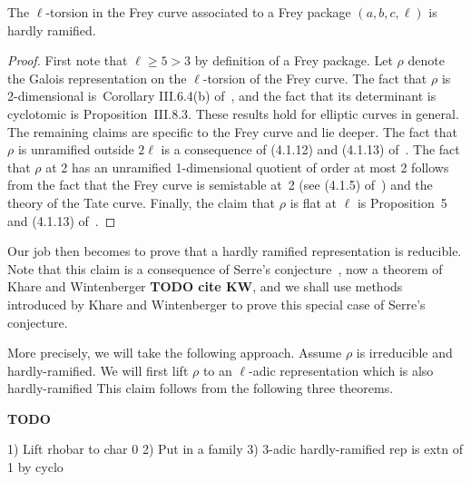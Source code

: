 \begin{theorem}
  \label{Frey_curve_hardly_ramified}
  The $\ell$-torsion in the Frey curve associated to a Frey package $(a,b,c,\ell)$
  is hardly ramified.
\end{theorem}
\begin{proof}
  First note that $\ell\geq5>3$ by definition of a Frey package. Let $\rho$
  denote the Galois representation on the $\ell$-torsion of the Frey curve.
  The fact that $\rho$ is 2-dimensional is~Corollary
  III.6.4(b) of~\cite{silverman1}, and the fact that its determinant is
  cyclotomic is Proposition~III.8.3. These results hold for elliptic curves
  in general. The remaining claims are specific to the Frey curve and lie
  deeper. The fact that $\rho$ is unramified outside $2\ell$ is a consequence
  of (4.1.12) and (4.1.13) of~\cite{serreconj}. The fact that $\rho$ at 2
  has an unramified 1-dimensional quotient of order at most 2 follows from
  the fact that the Frey curve is semistable at~2 (see (4.1.5) of~\cite{serreconj})
  and the theory of the Tate curve. Finally, the claim that $\rho$ is flat at $\ell$
  is Proposition~5 and (4.1.13) of~\cite{serreconj}.
\end{proof}

Our job then becomes to prove that a hardly ramified representation is reducible.
Note that this claim is a consequence of Serre's conjecture~\cite{serreconj},
now a theorem of Khare and Wintenberger {\bf TODO cite KW}, and we shall use
methods introduced by Khare and Wintenberger to prove this special case of
Serre's conjecture.

More precisely, we will take the following approach. Assume $\rho$ is irreducible
and hardly-ramified. We will first lift $\rho$ to an $\ell$-adic representation
which is also hardly-ramified
This claim follows from the following three theorems.

{\bf TODO}

1) Lift rhobar to char 0
2) Put in a family
3) 3-adic hardly-ramified rep is extn of 1 by cyclo
